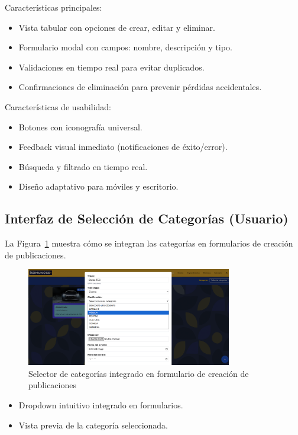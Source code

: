 Características principales:
\begin{itemize}
  \item Vista tabular con opciones de crear, editar y eliminar.
  \item Formulario modal con campos: nombre, descripción y tipo.
  \item Validaciones en tiempo real para evitar duplicados.
  \item Confirmaciones de eliminación para prevenir pérdidas accidentales.
\end{itemize}

Características de usabilidad:
\begin{itemize}
  \item Botones con iconografía universal.
  \item Feedback visual inmediato (notificaciones de éxito/error).
  \item Búsqueda y filtrado en tiempo real.
  \item Diseño adaptativo para móviles y escritorio.
\end{itemize}

\subsection{Interfaz de Selección de Categorías (Usuario)}

La Figura~\ref{fig:categorias-selector} muestra cómo se integran las categorías en formularios de creación de publicaciones.

\begin{figure}[H]
  \centering
  \includegraphics[width=0.8\textwidth]{project/images/imagen2.png}
  \caption{Selector de categorías integrado en formulario de creación de publicaciones}
  \label{fig:categorias-selector}
\end{figure}

\begin{itemize}
  \item Dropdown intuitivo integrado en formularios.
  \item Vista previa de la categoría seleccionada.
\end{itemize}

